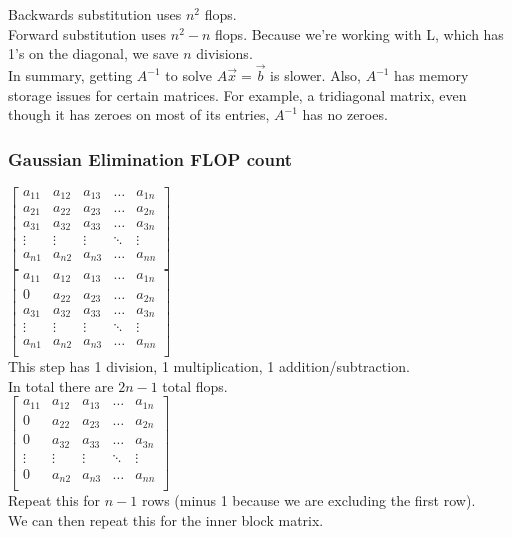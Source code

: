 \documentclass[12pt, letterpaper]{article}
\begin{document}
\noindent Backwards substitution uses $n^2$ flops. \\
\noindent Forward substitution uses $n^2-n$ flops. Because we're working with L, which has 1's on the diagonal, we save $n$ divisions. \\

In summary, getting $A^{-1}$ to solve $A\vec x = \vec b$ is slower. Also, $A^{-1}$ has memory storage issues for certain matrices.
For example, a tridiagonal matrix, even though it has zeroes on most of its entries, $A^{-1}$ has no zeroes.

\subsubsection{Gaussian Elimination FLOP count}
\begin{center}
$\begin{bmatrix}
    a_{11} & a_{12} & a_{13} & \ldots & a_{1n} \\
    a_{21} & a_{22} & a_{23} & \ldots & a_{2n} \\
    a_{31} & a_{32} & a_{33} & \ldots & a_{3n} \\
    \vdots & \vdots & \vdots & \ddots & \vdots \\
    a_{n1} & a_{n2} & a_{n3} & \ldots & a_{nn} \\    
\end{bmatrix}$ \\

$\begin{bmatrix}
    a_{11} & a_{12} & a_{13} & \ldots & a_{1n} \\
    0 & a_{22} & a_{23} & \ldots & a_{2n} \\
    a_{31} & a_{32} & a_{33} & \ldots & a_{3n} \\
    \vdots & \vdots & \vdots & \ddots & \vdots \\
    a_{n1} & a_{n2} & a_{n3} & \ldots & a_{nn} \\    
\end{bmatrix}$ \\
This step has 1 division, 1 multiplication, 1 addition/subtraction. \\
In total there are $2n-1$ total flops.\\
$\begin{bmatrix}
    a_{11} & a_{12} & a_{13} & \ldots & a_{1n} \\
    0 & a_{22} & a_{23} & \ldots & a_{2n} \\
    0 & a_{32} & a_{33} & \ldots & a_{3n} \\
    \vdots & \vdots & \vdots & \ddots & \vdots \\
    0 & a_{n2} & a_{n3} & \ldots & a_{nn} \\    
\end{bmatrix}$ \\
Repeat this for $n-1$ rows (minus 1 because we are excluding the first row).\\
We can then repeat this for the inner block matrix.
\end{center}
\end{document}

